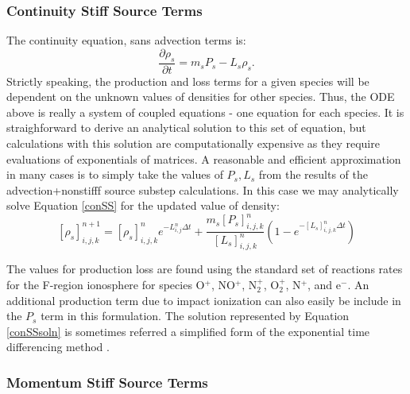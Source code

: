 \documentclass[11pt,letterpaper]{article}
\begin{document}
\subsubsection{Continuity Stiff Source Terms}

The continuity equation, sans advection terms is:
\begin{equation}
\frac{\partial \rho_s }{\partial t} = m_s P_s - L_s \rho_s. \label{conSS}
\end{equation}
Strictly speaking, the production and loss terms for a given species will be dependent on the unknown values of densities for other species.  Thus, the ODE above is really a system of coupled equations - one equation for each species.  It is straighforward to derive an analytical solution to this set of equation, but calculations with this solution are computationally expensive as they require evaluations of exponentials of matrices.  A reasonable and efficient approximation in many cases is to simply take the values of $P_s,L_s$ from the results of the advection+nonstifff source substep calculations.  In this case we may analytically solve Equation \ref{conSS} for the updated value of density:  
\begin{equation}
\left[ \rho_s \right]_{i,j,k}^{n+1} = \left[ \rho_s \right]_{i,j,k}^n e^{-L_{i,j}^n \Delta t} + \frac{m_s \left[ P_s \right]_{i,j,k}^n}{\left[ L_s \right]_{i,j,k}^n} \left( 1 - e^{-\left[ L_s \right]_{i,j,k}^n \Delta t} \right) \label{conSSsoln}
\end{equation}

The values for production loss are found using the standard set of reactions rates for the F-region ionosphere for species O$^+$, NO$^+$, N$_2^+$, O$_2^+$, N$^+$, and e$^-$.  An additional production term due to impact ionization can also easily be include in the $P_s$ term in this formulation.  The solution represented by Equation \ref{conSSsoln} is sometimes referred a simplified form of the exponential time differencing method \citep{Leveque:2007}.  

\subsubsection{Momentum Stiff Source Terms}
\end{document}
